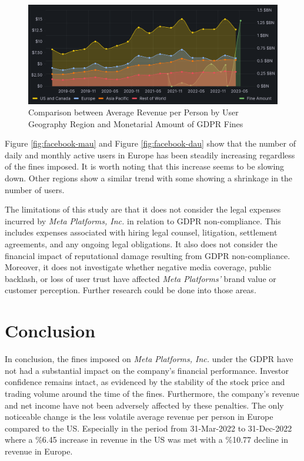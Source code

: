 \documentclass[12pt, a4paper]{article}
\begin{document}
\begin{figure}[H]
    \centering
    \includegraphics[width=1.00\textwidth]{rel-fines-avg-revenue-per-person-region}
    \caption{Comparison between Average Revenue per Person by User Geography Region and Monetarial Amount of GDPR Fines}
    \label{fig:rel-fines-avg-revenue-per-person-region}
\end{figure}

Figure \ref{fig:facebook-mau} and Figure \ref{fig:facebook-dau} show that the
number of daily and monthly active users in Europe has been steadily increasing
regardless of the fines imposed. It is worth noting that this increase seems to
be slowing down. Other regions show a similar trend with some showing a
shrinkage in the number of users.


The limitations of this study are that it does not consider the legal expenses
incurred by \textit{Meta Platforms, Inc.} in relation to GDPR non-compliance.
This includes expenses associated with hiring legal counsel, litigation,
settlement agreements, and any ongoing legal obligations. It also does not
consider the financial impact of reputational damage resulting from GDPR
non-compliance. Moreover, it does not investigate whether negative media
coverage, public backlash, or loss of user trust have affected \textit{Meta
Platforms'} brand value or customer perception. Further research could be done
into those areas.
\section*{Conclusion}

In conclusion, the fines imposed on \textit{Meta Platforms, Inc.} under the GDPR
have not had a substantial impact on the company's financial performance.
Investor confidence remains intact, as evidenced by the stability of the stock
price and trading volume around the time of the fines. Furthermore, the
company's revenue and net income have not been adversely affected by these
penalties. The only noticeable change is the less volatile average revenue per
person in Europe compared to the US. Especially in the period from 31-Mar-2022
to 31-Dec-2022 where a \%6.45 increase in revenue in the US was met with a
\%10.77 decline in revenue in Europe.



\end{document}
